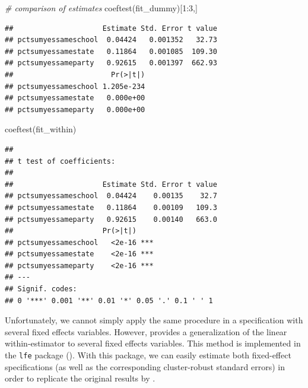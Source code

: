 \documentclass[
  12pt,
]{style/krantz}
\newenvironment{Shaded}{\begin{snugshade}}{\end{snugshade}}
\newcommand{\CommentTok}[1]{\textcolor[rgb]{0.56,0.35,0.01}{\textit{#1}}}
\newcommand{\DecValTok}[1]{\textcolor[rgb]{0.00,0.00,0.81}{#1}}
\newcommand{\FunctionTok}[1]{\textcolor[rgb]{0.00,0.00,0.00}{#1}}
\newcommand{\NormalTok}[1]{#1}
\newcommand{\SpecialCharTok}[1]{\textcolor[rgb]{0.00,0.00,0.00}{#1}}
\begin{document}
\begin{Shaded}
\begin{Highlighting}[]
\CommentTok{\# comparison of estimates}
\FunctionTok{coeftest}\NormalTok{(fit\_dummy)[}\DecValTok{1}\SpecialCharTok{:}\DecValTok{3}\NormalTok{,]}
\end{Highlighting}
\end{Shaded}

\begin{verbatim}
##                     Estimate Std. Error t value
## pctsumyessameschool  0.04424   0.001352   32.73
## pctsumyessamestate   0.11864   0.001085  109.30
## pctsumyessameparty   0.92615   0.001397  662.93
##                       Pr(>|t|)
## pctsumyessameschool 1.205e-234
## pctsumyessamestate   0.000e+00
## pctsumyessameparty   0.000e+00
\end{verbatim}

\begin{Shaded}
\begin{Highlighting}[]
\FunctionTok{coeftest}\NormalTok{(fit\_within)}
\end{Highlighting}
\end{Shaded}

\begin{verbatim}
## 
## t test of coefficients:
## 
##                     Estimate Std. Error t value
## pctsumyessameschool  0.04424    0.00135    32.7
## pctsumyessamestate   0.11864    0.00109   109.3
## pctsumyessameparty   0.92615    0.00140   663.0
##                     Pr(>|t|)    
## pctsumyessameschool   <2e-16 ***
## pctsumyessamestate    <2e-16 ***
## pctsumyessameparty    <2e-16 ***
## ---
## Signif. codes:  
## 0 '***' 0.001 '**' 0.01 '*' 0.05 '.' 0.1 ' ' 1
\end{verbatim}

Unfortunately, we cannot simply apply the same procedure in a specification with several fixed effects variables. However, \citet{GAURE20138} provides a generalization of the linear within-estimator to several fixed effects variables. This method is implemented in the \texttt{lfe} package (\citet{gaure_2013}). With this package, we can easily estimate both fixed-effect specifications (as well as the corresponding cluster-robust standard errors) in order to replicate the original results by \citet{cohen_malloy}.
\end{document}
